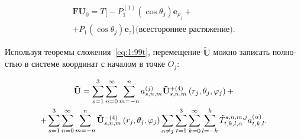 \begin{russian}
\begin{multline}
\mathbf{FU}_0=T\bigg[-P_1^{(1)}(\cos\theta_j)\mathbf{e}_{\rho_j}+ \\
+P_1(\cos\theta_j)\mathbf{e}_z\bigg]\,\text{(всестороннее растяжение)}.
\end{multline}

Используя теоремы сложения~\eqref{eq:1:99t}, перемещение $\mathbf{\tilde U}$ можно записать полностью в системе координат с началом в точке $O_j$:

\begin{multline}
{\bf{\tilde U}} = \sum\limits_{s = 1}^3 {\sum\limits_{n = 0}^\infty  {\sum\limits_{m =  - n }^{n } {a_{s,n,m}^{(j)}} } } {\bf{\tilde U}}_{s,n,m}^{ +(4)}\left( {{r_j},{\theta _j},{\varphi _j}} \right) + \\
+ \sum\limits_{s=1}^3\sum\limits_{n = 0}^\infty\sum\limits_{m =  - n }^{n }{\bf{\tilde U}}_{s,n,m}^{ - (4)}\left( {{r_j},{\theta _j},{\varphi _j}} \right)\sum\limits_{\alpha  \ne j}\sum\limits_{t=1}^3\sum\limits_{k = 0}^\infty\mathop \sum \limits_{l =  - k}^{k}\tilde T_{t,k,l,\alpha}^{s,n,m,j}a_{t,k,l}^{(\alpha)}.
\label{eq:11:10}
\end{multline}


\end{russian}
